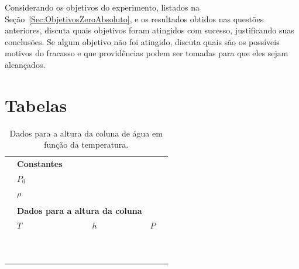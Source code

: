 \begin{question}[type={exam}]{1.5}
Considerando os objetivos do experimento, listados na Seção~\ref{Sec:ObjetivosZeroAbsoluto}, e os resultados obtidos nas questões anteriores, discuta quais objetivos foram atingidos com sucesso, justificando suas conclusões. Se algum objetivo não foi atingido, discuta quais são os possíveis motivos do fracasso e que providências podem ser tomadas para que eles sejam alcançados.
\end{question}

\section{Tabelas}

\begin{table}[!htb]
\caption{Dados para a altura da coluna de água em função da temperatura.}
\label{Tab:Dados}
	\begin{center}
		\begin{tabular}{cp{45mm}p{45mm}p{45mm}c}
		\toprule
		&\multicolumn{2}{l}{\textbf{Constantes}}\\
		\cmidrule{2-3}
		& \cellcolor[gray]{0.89} $P_0$ &\cellcolor[gray]{0.92} \\
		& \cellcolor[gray]{0.95} $\rho$ & \cellcolor[gray]{0.97}\\
		\cmidrule{2-3}
		\\
		&\multicolumn{2}{l}{\textbf{Dados para a altura da coluna}} \\
		\cmidrule{2-4}
		& $T$ & $h$ & $P$ & \\
		\cmidrule{2-4}
		& \cellcolor[gray]{0.89} & \cellcolor[gray]{0.92} & \cellcolor[gray]{0.89} \\
		& \cellcolor[gray]{0.95} & \cellcolor[gray]{0.97} & \cellcolor[gray]{0.95} \\
		& \cellcolor[gray]{0.89} & \cellcolor[gray]{0.92} & \cellcolor[gray]{0.89} \\
		& \cellcolor[gray]{0.95} & \cellcolor[gray]{0.97} & \cellcolor[gray]{0.95} \\
		& \cellcolor[gray]{0.89} & \cellcolor[gray]{0.92} & \cellcolor[gray]{0.89} \\
		& \cellcolor[gray]{0.95} & \cellcolor[gray]{0.97} & \cellcolor[gray]{0.95} \\
		& \cellcolor[gray]{0.89} & \cellcolor[gray]{0.92} & \cellcolor[gray]{0.89} \\
		& \cellcolor[gray]{0.95} & \cellcolor[gray]{0.97} & \cellcolor[gray]{0.95} \\
		& \cellcolor[gray]{0.89} & \cellcolor[gray]{0.92} & \cellcolor[gray]{0.89} \\
		& \cellcolor[gray]{0.95} & \cellcolor[gray]{0.97} & \cellcolor[gray]{0.95} \\
		\cmidrule{2-4}
		\bottomrule
		\end{tabular}
	\end{center}
\end{table}

